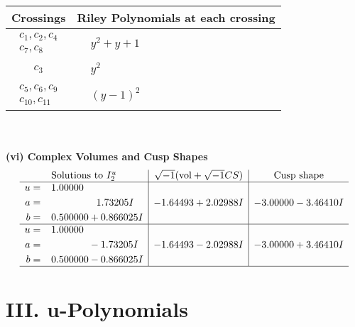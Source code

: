 \documentclass[1p]{elsarticle_modified}
\theoremstyle{definition}
\newcommand{\I}{\sqrt{-1}}
\begin{document}
\begin{tabular}{m{50pt}|m{274pt}}
Crossings & \hspace{64pt}Riley Polynomials at each crossing \\
\hline $$\begin{aligned}c_{1},c_{2},c_{4}\\c_{7},c_{8}\end{aligned}$$&$\begin{aligned}
&y^2+y+1
\end{aligned}$\\
\hline $$\begin{aligned}c_{3}\end{aligned}$$&$\begin{aligned}
&y^2
\end{aligned}$\\
\hline $$\begin{aligned}c_{5},c_{6},c_{9}\\c_{10},c_{11}\end{aligned}$$&$\begin{aligned}
&(y-1)^2
\end{aligned}$\\
\hline
\end{tabular}\\~\\
\newpage\flushleft \textbf{(vi) Complex Volumes and Cusp Shapes}
$$\begin{array}{c|c|c}  
\text{Solutions to }I^u_{2}& \I (\text{vol} + \sqrt{-1}CS) & \text{Cusp shape}\\
 \hline 
\begin{aligned}
u &= \phantom{-}1.00000\phantom{ +0.000000I} \\
a &= \phantom{-0.000000 -}1.73205 I \\
b &= \phantom{-}0.500000 + 0.866025 I\end{aligned}
 & -1.64493 + 2.02988 I & -3.00000 - 3.46410 I \\ \hline\begin{aligned}
u &= \phantom{-}1.00000\phantom{ +0.000000I} \\
a &= \phantom{-0.000000 } -1.73205 I \\
b &= \phantom{-}0.500000 - 0.866025 I\end{aligned}
 & -1.64493 - 2.02988 I & -3.00000 + 3.46410 I\\
 \hline 
 \end{array}$$\newpage
\newpage\renewcommand{\arraystretch}{1}
\centering \section*{ III. u-Polynomials}
\end{document}
